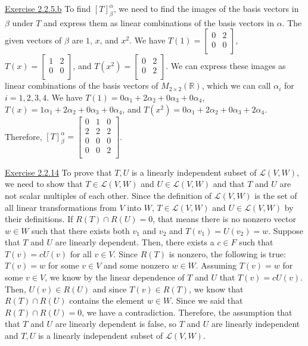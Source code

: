 \documentclass{exam}
\begin{document}
\underline{Exercise 2.2.5.b}
\newline
\newline
To find $[T]_{\beta}^{\alpha}$, we need to find the images of the basis vectors in $\beta$ under $T$ and express them as linear combinations of the basis vectors in $\alpha$. The given vectors of $\beta$ are $1$, $x$, and $x^2$. We have $T(1) = \begin{bmatrix}
0 & 2 \\
0 & 0 \\
\end{bmatrix}$, $T(x) = \begin{bmatrix}
1 & 2 \\
0 & 0 \\
\end{bmatrix}$, and $T(x^2) = \begin{bmatrix}
0 & 2 \\
0 & 2 \\
\end{bmatrix}$. We can express these images as linear combinations of the basis vectors of $M_{2\times 2}(\mathbb{R})$, which we can call $\alpha_i$ for $i=1,2,3,4$. We have $T(1) = 0\alpha_1 + 2\alpha_2 + 0\alpha_3 + 0\alpha_4$, $T(x) = 1\alpha_1 + 2\alpha_2 + 0\alpha_3 + 0\alpha_4$, and $T(x^2) = 0\alpha_1 + 2\alpha_2 + 0\alpha_3 + 2\alpha_4$. Therefore, $[T]_{\beta}^{\alpha} = \begin{bmatrix}
        0 & 1 & 0 \\
        2 & 2 & 2 \\
        0 & 0 & 0 \\
        0 & 0 & 2 \\
        \end{bmatrix}$.
\newline

\underline{Exercise 2.2.14}
\newline
\newline
To prove that ${T,U}$ is a linearly independent subset of $\mathcal{L}(V,W)$, we need to show that $T\in\mathcal{L}(V,W)$ and $U\in\mathcal{L}(V,W)$ and that $T$ and $U$ are not scalar multiples of each other. Since the definition of $\mathcal{L}(V,W)$ is the set of all linear transformations from $V$ into $W$, $T\in\mathcal{L}(V,W)$ and $U\in\mathcal{L}(V,W)$ by their definitions. If $R(T)\cap R(U)={0}$, that means there is no nonzero vector $w\in W$ such that there exists both $v_1$ and $v_2$ and $T(v_1)=U(v_2)=w$. Suppose that $T$ and $U$ are linearly dependent. Then, there exists a $c\in F$ such that $T(v)=cU(v)$ for all $v\in V$. Since $R(T)$ is nonzero, the following is true: $T(v)=w$ for some $v\in V$ and some nonzero $w\in W$. Assuming $T(v)=w$ for some $v\in V$, we know by the linear dependence of $T$ and $U$ that $T(v)=cU(v)$. Then, $U(v)\in R(U)$ and since $T(v)\in R(T)$, we know that $R(T)\cap R(U)$ contains the element $w\in W$. Since we said that $R(T)\cap R(U)={0}$, we have a contradiction. Therefore, the assumption that that $T$ and $U$ are linearly dependent is false, so $T$ and $U$ are linearly independent and ${T,U}$ is a linearly independent subset of $\mathcal{L}(V,W)$.
\end{document}
